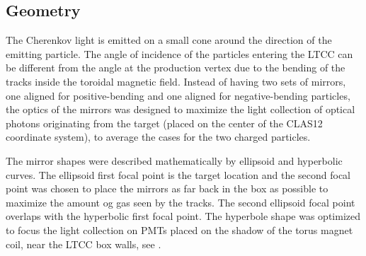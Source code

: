 \subsection{Geometry}

The Cherenkov light is emitted on a small cone around the direction of the emitting particle. The angle of
incidence of the particles entering the LTCC can be different from the angle at the production vertex due to the bending of the tracks
inside the toroidal magnetic field. Instead of having two sets of mirrors, one aligned for positive-bending and one aligned for negative-bending particles,
the optics of the mirrors was designed to maximize the light collection of optical photons originating from the target (placed on the center of the CLAS12 coordinate system),
to average the cases for the two charged particles.

The mirror shapes were described mathematically by ellipsoid and hyperbolic curves.
The ellipsoid first focal point is the target location and the second focal point was chosen
to place the mirrors as far back in the box as possible to maximize the amount og gas seen by the tracks.
The second ellipsoid focal point overlaps with the hyperbolic first focal point. The hyperbole shape was optimized to focus the light
collection on PMTs placed on the shadow of the torus magnet coil, near the LTCC box walls, see .


